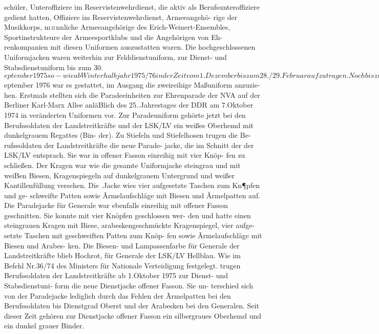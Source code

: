 schüler, Unteroffiziere im Reservistenwehrdienst,
die aktiv als Berufsunteroffiziere gedient hatten, Offiziere im Reservistenwehrdienst, Armeeangehö-
rige der Musikkorps, m¤nnliche Armeeangehörige
des Erich-Weinert-Ensembles, Sportinstrukteure
der Armeesportklubs und die Angehörigen von Eh-
renkompanien mit diesen Uniformen auszustatten
waren.
Die hochgeschlossenen Uniformjacken waren
weiterhin zur Felddienstuniform, zur Dienst- und
Stabsdienstuniform bis zum 30.$eptember 1975 so-
wie ab Winterhalbjahr 1975/76 in der Zeit vom
1.Dezember bis zum 28./29.Februar aufzutragen.
Noch bis zum 30.$eptember 1976 war es gestattet,
im Ausgang die zweireihige Maßuniform anzuzie-
hen.
Erstmals stellten sich die Paradeeinheiten zur
Ehrenparade der NVA auf der Berliner Karl-Marx
Allee anläBlich des 25..Jahrestages der DDR am
7.Oktober 1974 in veränderten Uniformen vor.
Zur Paradeuniform gehörte jetzt bei den Berufssoldaten der Landstreitkräfte und der LSK/LV ein
weißes Oberhemd mit dunkelgrauem Regattes (Bin-
der). Zu Stiefeln und Stiefelhosen trugen die Be-
rufssoldaten der Landstreitkräfte die neue Parade-
jacke, die im Schnitt der der LSK/LV entsprach.
Sie war in offener Fasson einreihig mit vier Knöp-
fen zu schließen. Der Kragen war wie die gesamte
Uniformjacke steingrau und mit weiBen Biesen,
Kragenspiegeln auf dunkelgrauem Untergrund und
weißer Kantillenfüllung versehen. Die .Jacke wies
vier aufgesetzte Taschen zum Kn¶pfen und ge-
schweifte Patten sowie Ãrmelaufschläge mit Biesen
und Ãrmelpatten auf. Die Paradejacke für Generale
war ebenfalls einreihig mit offener Fasson geschnitten. Sie konnte mit vier Knöpfen geschlossen wer-
den und hatte einen steingrauen Kragen mit Biese,
arabeskengeschmückte Kragenspiegel, vier aufge-
setzte Taschen mit geschweiften Patten zum Knöp-
fen sowie Ãrmelaufschläge mit Biesen und Arabes-
ken. Die Biesen- und Lampassenfarbe für Generale
der Landstreitkräfte blieb Hochrot, für Generale
der LSK/LV Hellblau. Wie im Befehl Nr.36/74 des
Ministers für Nationale Verteidigung festgelegt.
trugen Berufssoldaten der Landstreitkräfte ab
1.Oktober 1975 zur Dienst- und Stabsdienstuni-
form die neue Dienstjacke offener Fasson. Sie un-
terschied sich von der Paradejacke lediglich durch
das Fehlen der Ãrmelpatten bei den Berufssoldaten
bis Dienstgrad Oberst und der Arabesken bei den
Generalen.
Seit dieser Zeit gehören zur Dienstjacke offener
Fasson ein silbergraues Oberhemd und ein dunkel
grauer Binder.